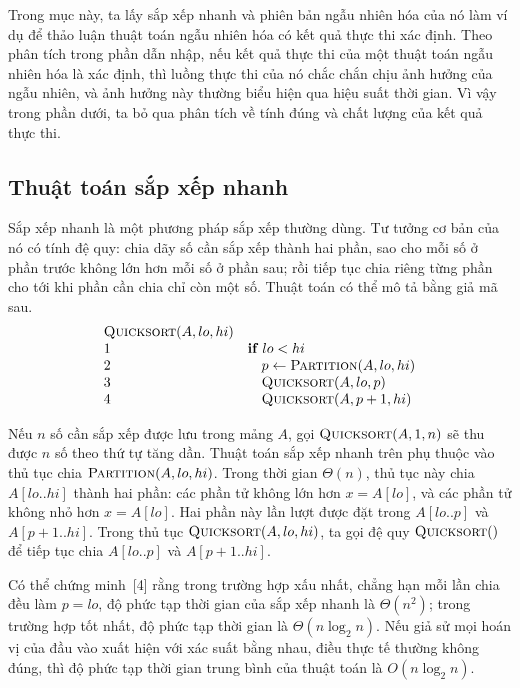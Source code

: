 \documentclass[11pt]{article}
\begin{document}
Trong mục này, ta lấy sắp xếp nhanh và phiên bản ngẫu nhiên hóa của nó làm ví
dụ để thảo luận thuật toán ngẫu nhiên hóa có kết quả thực thi xác định. Theo
phân tích trong phần dẫn nhập, nếu kết quả thực thi của một thuật toán ngẫu
nhiên hóa là xác định, thì luồng thực thi của nó chắc chắn chịu ảnh hưởng của
ngẫu nhiên, và ảnh hưởng này thường biểu hiện qua hiệu suất thời gian. Vì vậy
trong phần dưới, ta bỏ qua phân tích về tính đúng và chất lượng của kết quả
thực thi.

\subsection{Thuật toán sắp xếp nhanh}

Sắp xếp nhanh là một phương pháp sắp xếp thường dùng. Tư tưởng cơ bản của nó
có tính đệ quy: chia dãy số cần sắp xếp thành hai phần, sao cho mỗi số ở phần
trước không lớn hơn mỗi số ở phần sau; rồi tiếp tục chia riêng từng phần cho
tới khi phần cần chia chỉ còn một số. Thuật toán có thể mô tả bằng giả mã sau.
\[
\begin{array}{ll}
\textsc{Quicksort}(A,lo,hi)\\
1 & \textbf{if } lo < hi\\
2 & \quad p \leftarrow \textsc{Partition}(A,lo,hi)\\
3 & \quad \textsc{Quicksort}(A,lo,p)\\
4 & \quad \textsc{Quicksort}(A,p+1,hi)
\end{array}
\]

Nếu \(n\) số cần sắp xếp được lưu trong mảng \(A\), gọi
\(\textsc{Quicksort}(A,1,n)\) sẽ thu được \(n\) số theo thứ tự tăng dần. Thuật
toán sắp xếp nhanh trên phụ thuộc vào thủ tục chia
\(\textsc{Partition}(A,lo,hi)\). Trong thời gian \(\Theta(n)\), thủ tục này
chia \(A[lo..hi]\) thành hai phần: các phần tử không lớn hơn \(x=A[lo]\), và
các phần tử không nhỏ hơn \(x=A[lo]\). Hai phần này lần lượt được đặt trong
\(A[lo..p]\) và \(A[p+1..hi]\). Trong thủ tục
\(\textsc{Quicksort}(A,lo,hi)\), ta gọi đệ quy \(\textsc{Quicksort}()\) để
tiếp tục chia \(A[lo..p]\) và \(A[p+1..hi]\).

Có thể chứng minh~[4] rằng trong trường hợp xấu nhất, chẳng hạn mỗi lần chia
đều làm \(p=lo\), độ phức tạp thời gian của sắp xếp nhanh là
\(\Theta(n^2)\); trong trường hợp tốt nhất, độ phức tạp thời gian là
\(\Theta(n\log_2 n)\). Nếu giả sử mọi hoán vị của đầu vào xuất hiện với xác
suất bằng nhau, điều thực tế thường không đúng, thì độ phức tạp thời gian
trung bình của thuật toán là \(O(n\log_2 n)\).
\end{document}
